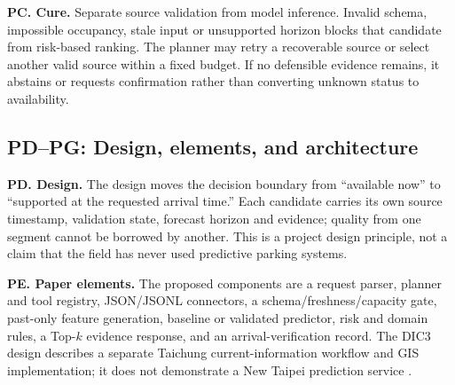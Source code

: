 \documentclass[conference,letterpaper,10pt]{IEEEtran}
\begin{document}
\noindent\textbf{PC. Cure.} Separate source validation from model inference. Invalid schema, impossible occupancy, stale input or unsupported horizon blocks that candidate from risk-based ranking. The planner may retry a recoverable source or select another valid source within a fixed budget. If no defensible evidence remains, it abstains or requests confirmation rather than converting unknown status to availability.

\subsection{PD--PG: Design, elements, and architecture}
\noindent\textbf{PD. Design.} The design moves the decision boundary from ``available now'' to ``supported at the requested arrival time.'' Each candidate carries its own source timestamp, validation state, forecast horizon and evidence; quality from one segment cannot be borrowed by another. This is a project design principle, not a claim that the field has never used predictive parking systems.

\noindent\textbf{PE. Paper elements.} The proposed components are a request parser, planner and tool registry, JSON/JSONL connectors, a schema/freshness/capacity gate, past-only feature generation, baseline or validated predictor, risk and domain rules, a Top-$k$ evidence response, and an arrival-verification record. The DIC3 design describes a separate Taichung current-information workflow and GIS implementation; it does not demonstrate a New Taipei prediction service \cite{dic3design}.
\end{document}
